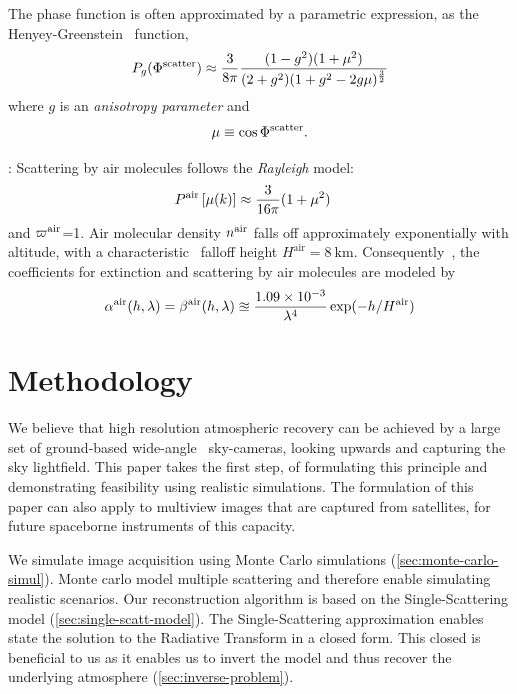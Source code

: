 \documentclass[10pt,letterpaper]{article}
\begin{document}
The phase function is often approximated by a parametric expression,
as the Henyey-Greenstein~\cite{Cornette1995} function,
\begin{align}
  P_g(\Phi^{\rm scatter})\approx \frac{3} {8\pi} \frac{(1 -
    g^2)(1+\mu^2)} {(2+g^2)(1 + g^2 - 2g\mu)^\frac{3}{2}}
  \label{eq:aerosol_scatter}
\end{align}
where $g$ is an {\em anisotropy parameter} and
\begin{align}
  \mu\equiv \cos \Phi^{\rm scatter}.
  \label{eq:mu}
\end{align}

: Scattering by air molecules follows the
{\em Rayleigh} model:
\begin{align}
  P^{\rm air}\left[\mu(k)\right] &\approx \frac{3}{16\pi}(1+\mu^2)
  \label{eq:rayleighP}
\end{align}
and $\varpi^{\rm air}$=1. Air molecular density $n^{\rm air}$ falls
off approximately exponentially with altitude, with a
characteristic~\cite{Levi1980} falloff height $H^\mathrm{air}=8\
\si{\km}$. Consequently~\cite{Levi1980}, the coefficients for
extinction and scattering by air molecules are modeled by
\begin{align}
  \alpha^{\rm air}(h, \lambda)=\beta^{\rm air}(h, \lambda) \approxeq
  \frac{1.09 \times 10^{-3}}{\lambda^4}
  \exp(-h/H^\mathrm{air}) %
  \label{eq:rayleighbeta}
\end{align}


\section{Methodology}
\label{sec:methodology}

We believe that high resolution atmospheric recovery can be achieved
by a large set of ground-based wide-angle~\cite{Cossairt2011,
  Peleg01omnistereo:panoramic, Koppal:2011:WMS:2191740.2192152}
sky-cameras, looking upwards and capturing the sky lightfield.  This
paper takes the first step, of formulating this principle and
demonstrating feasibility using realistic simulations. The formulation
of this paper can also apply to multiview images that are captured
from satellites, for future spaceborne instruments of this capacity.

We simulate image acquisition using Monte Carlo simulations
(\cref{sec:monte-carlo-simul}).  Monte carlo model multiple scattering
and therefore enable simulating realistic scenarios. Our
reconstruction algorithm is based on the Single-Scattering model
(\cref{sec:single-scatt-model}). The Single-Scattering approximation
enables state the solution to the Radiative Transform in a closed
form. This closed is beneficial to us as it enables us to invert the
model and thus recover the underlying atmosphere
(\cref{sec:inverse-problem}).
\end{document}
